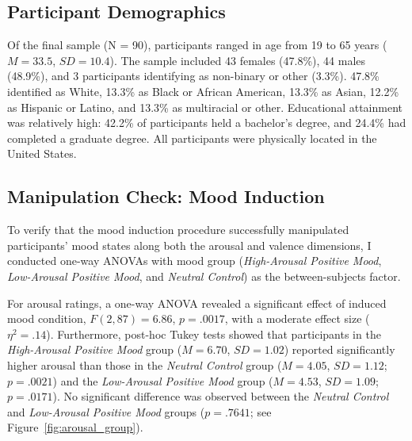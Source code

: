 \documentclass[../MA_Thesis.tex]{subfiles}
\begin{document}
\subsection*{Participant Demographics}

Of the final sample (N = 90), participants ranged in age from 19 to 65 years ($M = 33.5$, $SD = 10.4$). The sample included 43 females (47.8\%), 44 males (48.9\%), and 3 participants identifying as non-binary or other (3.3\%). 47.8\% identified as White, 13.3\% as Black or African American, 13.3\% as Asian, 12.2\% as Hispanic or Latino, and 13.3\% as multiracial or other. Educational attainment was relatively high: 42.2\% of participants held a bachelor’s degree, and 24.4\% had completed a graduate degree. All participants were physically located in the United States.

\subsection*{Manipulation Check: Mood Induction}
To verify that the mood induction procedure successfully manipulated participants’ mood states along both the arousal and valence dimensions, I conducted one-way ANOVAs with mood group (\textit{High-Arousal Positive Mood}, \textit{Low-Arousal Positive Mood}, and
\textit{Neutral Control}) as the between-subjects factor.

For arousal ratings, a one-way ANOVA revealed a significant effect of induced mood condition, $F(2, 87) = 6.86$, $p = .0017$, with a moderate effect size ($\eta^2 = .14$). Furthermore, post-hoc Tukey tests showed that participants in the \textit{High-Arousal Positive Mood} group ($M = 6.70$, $SD = 1.02$) reported significantly higher arousal than those in the \textit{Neutral Control} group ($M = 4.05$, $SD = 1.12$; $p = .0021$) and the \textit{Low-Arousal Positive Mood} group ($M = 4.53$, $SD = 1.09$; $p = .0171$). No significant difference was observed between the \textit{Neutral Control} and \textit{Low-Arousal Positive Mood} groups ($p = .7641$; see Figure~\ref{fig:arousal_group}). 
\end{document}
